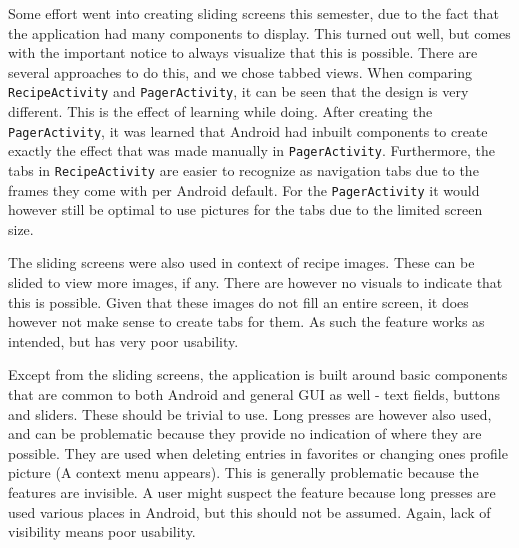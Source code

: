 Some effort went into creating sliding screens this semester, due to the fact that the application had many components to display. This turned out well, but comes with the important notice to always visualize that this is possible. There are several approaches to do this, and we chose tabbed views. When comparing \texttt{RecipeActivity} and \texttt{PagerActivity}, it can be seen that the design is very different. This is the effect of learning while doing. After creating the \texttt{PagerActivity}, it was learned that Android had inbuilt components to create exactly the effect that was made manually in \texttt{PagerActivity}. Furthermore, the tabs in \texttt{RecipeActivity} are easier to recognize as navigation tabs due to the frames they come with per Android default. For the \texttt{PagerActivity} it would however still be optimal to use pictures for the tabs due to the limited screen size.

The sliding screens were also used in context of recipe images. These can be slided to view more images, if any. There are however no visuals to indicate that this is possible. Given that these images do not fill an entire screen, it does however not make sense to create tabs for them. As such the feature works as intended, but has very poor usability.

Except from the sliding screens, the application is built around basic components that are common to both Android and general GUI as well - text fields, buttons and sliders. These should be trivial to use. Long presses are however also used, and can be problematic because they provide no indication of where they are possible. They are used when deleting entries in favorites or changing ones profile picture (A context menu appears). This is generally problematic because the features are invisible. A user might suspect the feature because long presses are used various places in Android, but this should not be assumed. Again, lack of visibility means poor usability.
